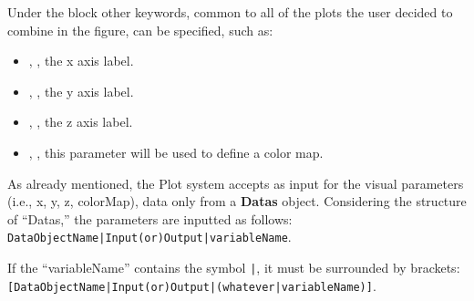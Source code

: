 Under the  block other keywords, common to all of the
plots the user decided to combine in the figure, can be specified, such as:
\begin{itemize}
  \item {}, , the x axis
  label.
  \item {}, , the y axis
  label.
  \item {}, ,
  the z axis label.
  \item {}, , this parameter will be used to
  define a color map.
\end{itemize}
As already mentioned, the Plot system accepts as input for the visual parameters
(i.e., x, y, z, colorMap), data only from a \textbf{Datas} object.
%
Considering the structure of ``Datas,'' the parameters are inputted as follows:
\texttt{DataObjectName|Input(or)Output|variableName}.

If the ``variableName'' contains the symbol \texttt{|}, it must be surrounded by
brackets:
\texttt{[DataObjectName|Input(or)Output|(whatever|variableName)]}.

